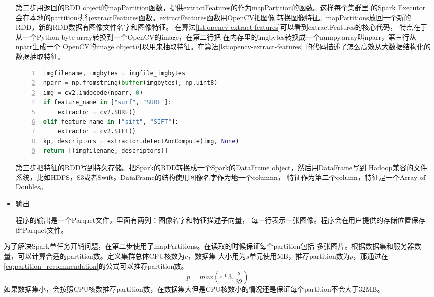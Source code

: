 \begin{itemize}
        第二步用返回的RDD object的mapPartition函数，提供extractFeatures的作为mapPartition的函数。这样每个集群里
        的Spark Executor会在本地的partition执行extractFeatures函数。extractFeatures函数用OpenCV把图像
        转换图像特征。mapPartitions放回一个新的RDD，新的RDD数据有图像文件名字和图像特征。
        在算法\ref{lst:opencv-extract-features}可以看到extractFeatures的核心代码，
        特点在于从一个Python byte array转换到一个OpenCV的image，在第二行把
        在内存里的imgbytes转换成一个numpy.array叫nparr，第三行从nparr生成一个
        OpenCV的image object可以用来抽取特征。在算法\ref{lst:opencv-extract-features}
        的代码描述了怎么高效从大数据结构化的数据抽取特征。
        \begin{minipage}{\linewidth}
        \begin{lstlisting}[language=Python,
                           basicstyle=\small,
                           numbers=left,
                           showstringspaces=false,
                           caption={OpenCV从内存读取图像抽取特征},
                           label={lst:opencv-extract-features}]
imgfilename, imgbytes = imgfile_imgbytes
nparr = np.fromstring(buffer(imgbytes), np.uint8)
img = cv2.imdecode(nparr, 0)
if feature_name in ["surf", "SURF"]:
    extractor = cv2.SURF()
elif feature_name in ["sift", "SIFT"]:
    extractor = cv2.SIFT()
kp, descriptors = extractor.detectAndCompute(img, None)
return [(imgfilename, descriptors)]
        \end{lstlisting}
        \end{minipage}

        第三步把特征的RDD写到持久存储。把Spark的RDD转换成一个Spark的DataFrame object，然后用DataFrame写到
        Hadoop兼容的文件系统，比如HDFS，S3或者Swift。DataFrame的结构使用图像名字作为地一个columnn，
        特征作为第二个column，特征是一个Array of Doubles。


  \item 输出

        程序的输出是一个Parquet文件，里面有两列：图像名字和特征描述子向量，
        每一行表示一张图像。程序会在用户提供的存储位置保存此Parquet文件。

\end{itemize}

为了解决Spark单任务开销问题，在第二步使用了mapPartitions。在读取的时候保证每个partition包括
多张图片。根据数据集和服务器数量，可以计算合适的partition数。定义集群总体CPU核数为$c$，数据集
大小用为$s$单元使用MB，推荐partition数为$p$，那通过在\ref{eq:partition_recommendation}的公式可以推荐partition数。
\begin{equation} \label{eq:partition_recommendation}
p = max(c * 3, \frac{s}{32})
\end{equation}
如果数据集小，会按照CPU核数推荐partition数，在数据集大但是CPU核数小的情况还是保证每个partition不会大于32MB。



